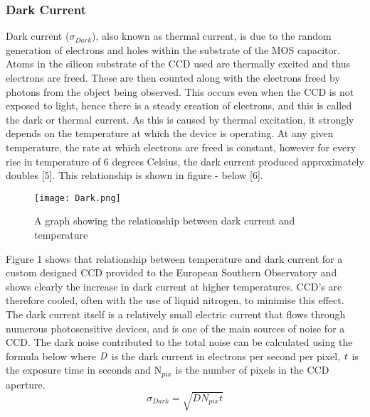 \documentclass[pdf,color]{UoBnote}
\begin{document}
\subsubsection{Dark Current}
Dark current ($\sigma$$_{Dark}$), also known as thermal current, is due to the random generation of electrons and holes within the substrate of the MOS capacitor. Atoms in the silicon substrate of the CCD used are thermally excited and thus electrons are freed. These are then counted along with the electrons freed by photons from the object being observed. This occurs even when the CCD is not exposed to light, hence there is a steady creation of electrons, and this is called the dark or thermal current. As this is caused by thermal excitation, it strongly depends on the temperature at which the device is operating. At any given temperature, the rate at which electrons are freed is constant, however for every rise in temperature of 6 degrees Celsius, the dark current produced approximately doubles [5]. This relationship is shown in figure - below [6]. 

\begin{figure}[H]
\begin{center}
\texttt{[image: Dark.png]}
\end{center}
\caption{A graph showing the relationship between dark current and temperature}\label{fig:figure1}
\end{figure}
\noindent
Figure 1 shows that relationship between temperature and dark current for a custom designed CCD provided to the European Southern Observatory and shows clearly the increase in dark current at higher temperatures. CCD’s are therefore cooled, often with the use of liquid nitrogen, to minimise this effect. The dark current itself is a relatively small electric current that flows through numerous photosensitive devices, and is one of the main sources of noise for a CCD. The dark noise contributed to the total noise can be calculated using the formula below where $\it{D}$ is the dark current in electrons per second per pixel, $\it{t}$ is the exposure time in seconds and N$_{pix}$ is the number of pixels in the CCD aperture.\\
\begin{equation}
\sigma_{Dark} = \sqrt{DN_{pix}t}
\end{equation}
\end{document}
